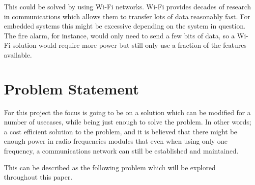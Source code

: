 This could be solved by using Wi-Fi networks.
Wi-Fi provides decades of research in communications which allows them to transfer lots of data reasonably fast.
For embedded systems this might be excessive depending on the system in question.
The fire alarm, for instance, would only need to send a few bits of data, so a Wi-Fi solution would require more power but still only use a fraction of the features available.






\section{Problem Statement}\label{sec:problemStatement}

For this project the focus is going to be on a solution which can be modified for a number of usecases, while being just enough to solve the problem.
In other words; a cost efficient solution to the problem, and it is believed that there might be enough power in radio frequencies modules that even when using only one frequency, a communications network can still be established and maintained.

This can be described as the following problem which will be explored throughout this paper.


